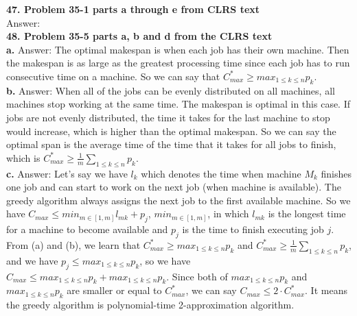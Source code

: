 \documentclass{article}
\begin{document}
\textbf{47. Problem 35-1 parts a through e from CLRS text} \\ \newline
Answer: \\ \newline
\textbf{48. Problem 35-5 parts a, b and d from the CLRS text} \\ \newline
\textbf{a.}
Answer: The optimal makespan is when each job has their own machine. Then the makespan is as large as the greatest processing time since each job has to run consecutive time on a machine. So we can say that $C_{max}^{*} \geq max_{1\leq k \leq n}p_k$.\\ \newline
\textbf{b.}
Answer: When all of the jobs can be evenly distributed on all machines, all machines stop working at the same time. The makespan is optimal in this case. If jobs are not evenly distributed, the time it takes for the last machine to stop would increase, which is higher than the optimal makespan. So we can say the optimal span is the average time of the time that it takes for all jobs to finish, which is $C_{max}^{*} \geq \frac{1}{m} \sum_{1\leq k \leq n}p_k$. \\ \newline
\textbf{c.}
Answer: Let's say we have $l_k$ which denotes the time when machine $M_k$ finishes one job and can start to work on the next job (when machine is available). The greedy algorithm always assigns the next job to the first available machine. So we have $C_{max} \leq min_{m\in[1, m]}l_{mk} + p_j$, $min_{m\in[1, m]}$, in which $l_{mk}$ is the longest time for a machine to become available and $p_j$ is the time to finish executing job $j$. From (a) and (b), we learn that $C_{max}^{*} \geq max_{1\leq k \leq n}p_k$ and $C_{max}^{*} \geq \frac{1}{m} \sum_{1\leq k \leq n}p_k$, and we have $p_j \leq max_{1\leq k \leq n}p_k$, so we have $C_{max} \leq max_{1\leq k \leq n}p_k + max_{1\leq k \leq n}p_k$. Since both of $max_{1\leq k \leq n}p_k$ and $max_{1\leq k \leq n}p_k$ are smaller or equal to $C_{max}^{*}$, we can say $C_{max} \leq 2\cdot C_{max}^{*}$. It means the greedy algorithm is polynomial-time 2-approximation algorithm.
\end{document}
